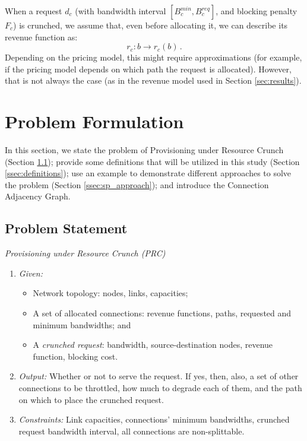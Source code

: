 \documentclass[journal]{IEEEtran}
\begin{document}
When a request $d_c$ (with bandwidth interval $[B_c^{min}, B_c^{req}]$, and blocking penalty $F_c$) is crunched, we assume that, even before allocating it, we can describe its revenue function as:
$$r_{c}:b \rightarrow r_{c}(b) \,.$$ 
Depending on the pricing model, this might require approximations (for example, if the pricing model depends on which path the request is allocated). However, that is not always the case (as in the revenue model used in Section \ref{sec:results}).

\section{Problem Formulation}\label{sec:problem}

In this section, we state the problem of Provisioning under Resource Crunch (Section \ref{ssec:problem-statement}); provide some definitions that will be utilized in this study (Section \ref{ssec:definitions}); use an example to demonstrate different approaches to solve the problem (Section \ref{ssec:sp_approach}); and introduce the Connection Adjacency Graph.

\subsection{Problem Statement} \label{ssec:problem-statement}

\noindent\textit{Provisioning under Resource Crunch (PRC)}
\begin{enumerate}[label=\textit{\Roman*.}]
 \item \textit{Given:}
 \begin{itemize}
 \item Network topology: nodes, links, capacities;
 \item A set of allocated connections: revenue functions, paths, requested and minimum bandwidths; and
 \item A \textit{crunched request}: bandwidth, source-destination nodes, revenue function, blocking cost.
 \end{itemize}
 \item \textit{Output:} Whether or not to serve the request. If yes, then, also, a set of other connections to be throttled, how much to degrade each of them, and the path on which to place the crunched request.
 \item \textit{Constraints:} Link capacities, connections' minimum bandwidths, crunched request bandwidth interval, all connections are non-splittable.
\end{enumerate}
\end{document}
